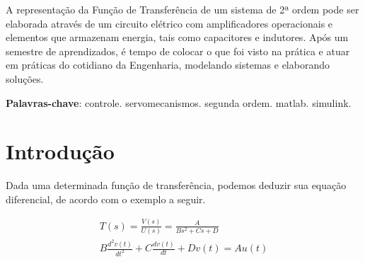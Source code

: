 \documentclass[
	article,			%
	11pt,				%
	oneside,			%
	a4paper,			%
	english,			%
	brazil,				%
	sumario=tradicional
	]{abntex2}
\begin{document}

\frenchspacing


%
%
\maketitle

\begin{resumoumacoluna}
 A representação da Função de Transferência de um sistema de 2ª ordem pode ser elaborada
 através de um circuito elétrico com amplificadores operacionais e elementos que armazenam
 energia, tais como capacitores e indutores. Após um semestre de aprendizados, é tempo de
 colocar o que foi visto na prática e atuar em práticas do cotidiano da Engenharia,
 modelando sistemas e elaborando soluções.

 \vspace{\onelineskip}

 \noindent
 \textbf{Palavras-chave}: controle. servomecanismos. segunda ordem. matlab. simulink.
\end{resumoumacoluna}

\textual

\section*{Introdução}

Dada uma determinada função de transferência, podemos deduzir sua equação diferencial,
de acordo com o exemplo a seguir.

\begin{align*}
  T(s) = \frac{V(s)}{U(s)} = \frac{A}{B s^2 + C s + D} \\
  B \frac{d^2 v(t)}{dt^2} + C \frac{d v(t)}{dt} + D v(t) = A u(t)
\end{align*}
\end{document}

